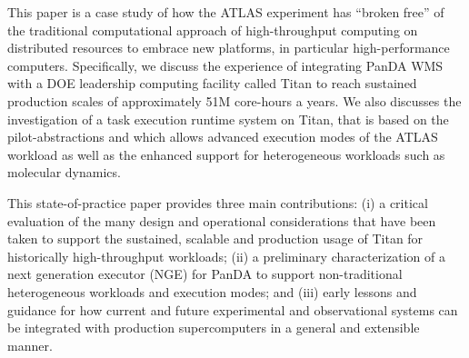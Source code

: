 This paper is a case study of how the ATLAS experiment has ``broken free'' of
the traditional computational approach of high-throughput computing on
distributed resources to embrace new platforms, in particular high-performance
computers. Specifically, we discuss the experience of integrating PanDA WMS with
a DOE leadership computing facility called Titan to reach sustained production
scales of approximately 51M core-hours a years. We also discusses the
investigation of a task execution runtime system on Titan, that is based on the
pilot-abstractions and which allows advanced execution modes of the ATLAS
workload as well as the enhanced support for heterogeneous workloads such as
molecular dynamics.


This state-of-practice paper provides three main contributions:  (i) a critical
evaluation of the many design and operational considerations that have been
taken to support the sustained, scalable and production usage of Titan for
historically high-throughput workloads; (ii) a preliminary characterization of a
next generation executor (NGE) for PanDA to support non-traditional
heterogeneous workloads and execution modes;  and (iii) early lessons and
guidance for how current and future experimental and observational systems can
be integrated with production supercomputers in a general and extensible manner.

